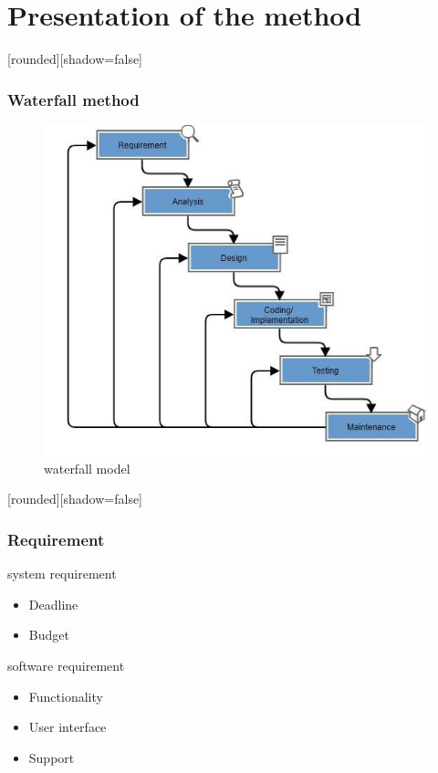 \documentclass[10pt]{beamer}
\begin{document}
\section{Presentation of the method}
\begin{frame}
[rounded][shadow=false]
\frametitle{Waterfall method}
\begin{figure}
    \centering
    \includegraphics[width=0.8\linewidth]{waterfall method.png}
    \caption{waterfall model}
\end{figure}
\end{frame}
\begin{frame}
[rounded][shadow=false]
\frametitle{Requirement}

\begin{block}{system requirement}
\begin{itemize}

    \item Deadline
        
    \item Budget
           
\end{itemize}
\end{block}

\begin{block}{software requirement}
\begin{itemize}

    \item Functionality
        
    \item User interface
        
    \item Support
        
\end{itemize}
  
\end{block}
\end{frame}
\end{document}
